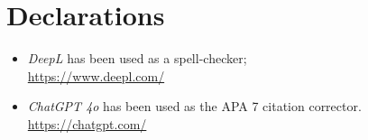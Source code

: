 \documentclass{article}
\begin{document}

\newpage
\setlength{\bibitemsep}{1.2\baselineskip}
\printbibliography[title={References, in alphabetical order}]
\vfill

\section*{Declarations}
\begin{itemize}
    \item \textit{DeepL} has been used as a spell-checker;\\
        \url{https://www.deepl.com/}
    \item \textit{ChatGPT 4o} has been used as the APA 7 citation corrector.\\
        \url{https://chatgpt.com/}
\end{itemize}
\end{document}
